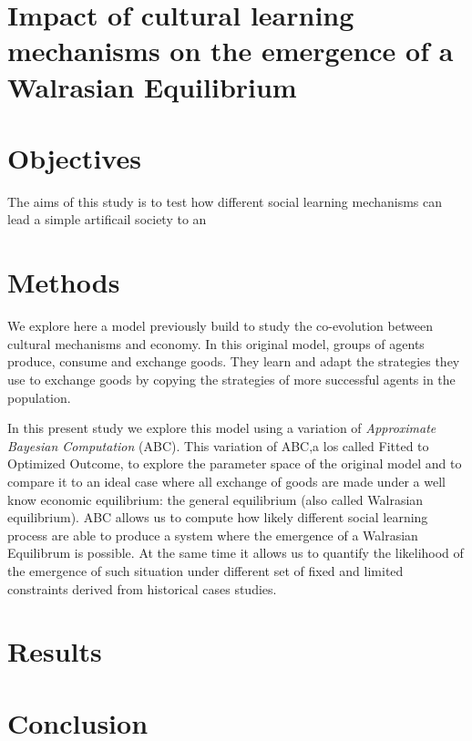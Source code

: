 \documentclass[a4paper,10pt]{report}
\begin{document}
\section*{Impact of cultural learning mechanisms on the emergence of a Walrasian Equilibrium}

\section{Objectives}
The aims of this study is to test how different social learning mechanisms can lead a simple artificail society to an 

\section{Methods}
We explore here a model previously build to study the co-evolution between cultural mechanisms and economy. In this original model, groups of agents produce, consume and exchange goods. They learn and adapt the strategies they use to exchange goods by copying the strategies of more successful agents in the population.

In this present study we explore this model using a variation of \emph{Approximate Bayesian Computation} (ABC). This variation of ABC,a los called Fitted to Optimized Outcome,  to explore the parameter space of the original model and to compare it to an ideal case where all exchange of goods are made under a well  know economic equilibrium: the  general equilibrium (also called Walrasian equilibrium). ABC allows us to compute how likely different social learning process are able to produce a system where the emergence of a Walrasian Equilibrum is possible. At the same time it allows us to quantify the likelihood of the emergence of such situation under different set of fixed and limited constraints derived from historical cases studies.

\section{Results}


\section{Conclusion}
\end{document}
